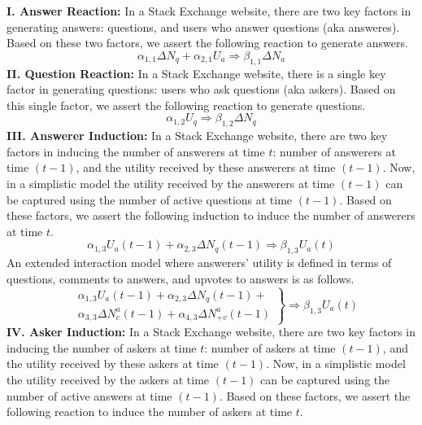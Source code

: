 \textbf{I. Answer Reaction:} In a Stack Exchange website, there are two key factors in generating answers: questions, and users who answer questions (aka answeres). Based on these two factors, we assert the following reaction to generate answers.
\begin{equation*}
\alpha_{1, 1} \Delta N_q + \alpha_{2, 1} U_a \Longrightarrow \beta_{1, 1} \Delta N_a
\end{equation*}
\indent \textbf{II. Question Reaction:} In a Stack Exchange website, there is a single key factor in generating questions: users who ask questions (aka askers). Based on this single factor, we assert the following reaction to generate questions.
\begin{equation*}
\alpha_{1, 2} U_q \Longrightarrow \beta_{1, 2} \Delta N_q
\end{equation*}
\indent \textbf{III. Answerer Induction:} In a Stack Exchange website, there are two key factors in inducing the number of answerers at time $t$: number of answerers at time $(t-1)$, and the utility received by these answerers at time $(t-1)$. Now, in a simplistic model the utility received by the answerers at time $(t-1)$ can be captured using the number of active questions at time $(t-1)$. Based on these factors, we assert the following induction to induce the number of answerers at time $t$.
\begin{equation*}
\alpha_{1, 3} U_a(t-1) + \alpha_{2, 3} \Delta N_q(t-1) \Longrightarrow \beta_{1, 3} U_a(t)
\end{equation*}
\noindent An extended interaction model where answerers' utility is defined in terms of questions, comments to answers, and upvotes to answers is as follows.
\begin{equation*}
\left.
\begin{aligned}
& \alpha_{1, 3} U_a(t-1) + \alpha_{2, 3} \Delta N_q(t-1) +\\
& \alpha_{3, 3} \Delta N_c^a(t-1) + \alpha_{4, 3} \Delta N_{+v}^a(t-1)
\end{aligned}
\right\}
\Longrightarrow \beta_{1, 3} U_a(t)
\end{equation*}
\indent \textbf{IV. Asker Induction:} In a Stack Exchange website, there are two key factors in inducing the number of askers at time $t$: number of askers at time $(t-1)$, and the utility received by these askers at time $(t-1)$. Now, in a simplistic model the utility received by the askers at time $(t-1)$ can be captured using the number of active answers at time $(t-1)$. Based on these factors, we assert the following reaction to induce the number of askers at time $t$.
